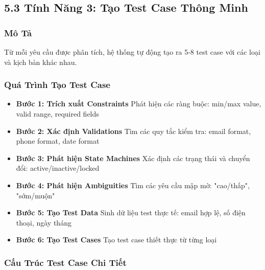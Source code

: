 \documentclass[14pt,a4paper]{article}
\begin{document}
\subsection{5.3 Tính Năng 3: Tạo Test Case Thông Minh}

\subsubsection{Mô Tả}
Từ mỗi yêu cầu được phân tích, hệ thống tự động tạo ra 5-8 test case 
với các loại và kịch bản khác nhau.

\subsubsection{Quá Trình Tạo Test Case}

\begin{itemize}
    \item \textbf{Bước 1: Trích xuất Constraints}
    Phát hiện các ràng buộc: min/max value, valid range, required fields
    
    \item \textbf{Bước 2: Xác định Validations}
    Tìm các quy tắc kiểm tra: email format, phone format, date format
    
    \item \textbf{Bước 3: Phát hiện State Machines}
    Xác định các trạng thái và chuyển đổi: active/inactive/locked
    
    \item \textbf{Bước 4: Phát hiện Ambiguities}
    Tìm các yêu cầu mập mờ: "cao/thấp", "sớm/muộn"
    
    \item \textbf{Bước 5: Tạo Test Data}
    Sinh dữ liệu test thực tế: email hợp lệ, số điện thoại, ngày tháng
    
    \item \textbf{Bước 6: Tạo Test Cases}
    Tạo test case thiết thực từ từng loại
\end{itemize}

\subsubsection{Cấu Trúc Test Case Chi Tiết}
\end{document}
